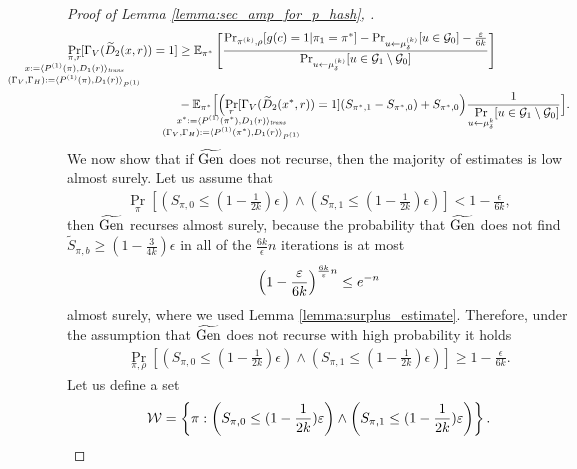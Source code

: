 \begin{proof}[Proof of Lemma \ref{lemma:sec_amp_for_p_hash}, \cite{holenstein2011general}]
\begin{align}
  \label{ineq:ex_pr_gamma}
\underset{
  \mathclap{
    \substack{\pi, r \\ x := \langle P^{(1)}(\pi), D_1(r) \rangle_{\mathit{trans}} \\ (\Gamma_V, \Gamma_H) := \langle P^{(1)}(\pi), D_1(r) \rangle_{P^{(1)}} }}}
{\Pr}[\Gamma_V(\widetilde{D}_2(x, r)) = 1]
&\geq \mathbb{E}_{\pi^*}\left[\frac{\Pr_{\pi^{(k)}, \rho}[g(c) = 1 | \pi_1 = \pi^*]
  - \Pr_{u \leftarrow \mu_{\delta}^{(k)}}[u \in \cG_0] - \frac{\epsilon}{6k}}{\Pr_{u \leftarrow \mu_{\delta}^{(k)}}[u \in \cG_1 \setminus \cG_0]}\right] \notag\\
&- \mathbb{E}_{\pi^*}\Bigl[\Bigl(
\underset{\mathclap{
  \substack{r \\ x^* := \langle P^{(1)}(\pi^*), D_1(r) \rangle_{\mathit{trans}} \\ (\Gamma_V, \Gamma_H) := \langle P^{(1)}(\pi^*), D_1(r) \rangle_{P^{(1)}} }}}
{\Pr}[\Gamma_V(\widetilde{D}_2(x^*, r)) = 1](S_{\pi^*,1} - S_{\pi^*,0})
 + S_{\pi^*,0}\Bigr)
\frac{1}{\underset{u \leftarrow \mu_{\delta}^k}{\Pr}[ u \in \cG_1 \setminus\cG_0]}\Bigr].
\end{align}
We now show that if $\widetilde{\Gen}$ does not recurse, then the majority of estimates is low almost surely.
Let us assume that
\begin{align}
\underset{\pi}{\Pr}\left[\left(S_{\pi,0} \leq (1 - \frac{1}{2k})\epsilon\right) \land \left( S_{\pi,1} \leq (1-\frac{1}{2k})\epsilon\right)\right] < 1 - \frac{\epsilon}{6k},
\end{align}
then $\widetilde{\Gen}$ recurses almost surely, because the probability that
$\widetilde{\Gen}$ does not find $\widetilde{S}_{\pi, b} \geq (1-\frac{3}{4k})\epsilon$ in all of the $\frac{6k}{\epsilon}n$ iterations is at most
\begin{align*}
  \Bigl(1 - \frac{\epsilon}{6k}\Bigr)^{\frac{6k}{\epsilon}n} \leq e^{-n}
\end{align*}
almost surely, where we used Lemma \ref{lemma:surplus_estimate}.
Therefore, under the assumption that $\widetilde{\Gen}$ does not recurse with high probability it holds
\begin{align}
\underset{\pi, \rho}{\Pr}\left[\left(S_{\pi,0} \leq (1 - \frac{1}{2k})\epsilon\right) \land \left( S_{\pi,1} \leq (1-\frac{1}{2k})\epsilon\right)\right] \geq 1 - \frac{\epsilon}{6k}.
\end{align}
Let us define a set
\begin{align}
  \cW = \left\{ \pi :  \left(S_{\pi,0} \leq (1 - \frac{1}{2k})\epsilon\right) \land \left( S_{\pi,1} \leq (1-\frac{1}{2k})\epsilon \right) \right\}.

\end{align}
\end{proof}
